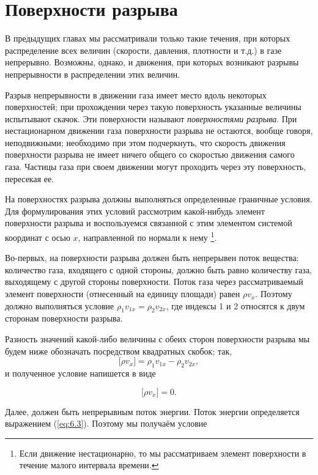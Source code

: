 \section{Поверхности разрыва}\label{sec:p84}

В предыдущих главах мы рассматривали только такие течения, при которых распределение всех величин (скорости, давления, плотности и т.д.) в газе непрерывно.
Возможны, однако, и движения, при которых возникают разрывы непрерывности в распределении этих величин.

Разрыв непрерывности в движении газа имеет место вдоль некоторых поверхностей; при прохождении через такую поверхность указанные величины испытывают скачок.
Эти поверхности называют \emph{поверхностями разрыва}.
При нестационарном движении газа поверхности разрыва не остаются, вообще говоря, неподвижными; необходимо при этом подчеркнуть, что скорость движения поверхности разрыва не имеет ничего общего со скоростью движения самого газа. Частицы газа при своем движении могут проходить через эту поверхность, пересекая ее.

На поверхностях разрыва должны выполняться определенные граничные условия. Для формулирования этих условий рассмотрим какой-нибудь элемент поверхности разрыва и воспользуемся связанной с этим элементом системой координат с осью $x$, направленной по нормали к нему \footnote{Если движение нестационарно, то мы рассматриваем элемент поверхности в течение малого интервала времени.}.

Во-первых, на поверхности разрыва должен быть непрерывен поток вещества: количество газа, входящего с одной стороны, должно быть равно количеству газа, выходящему с другой стороны поверхности.
Поток газа через рассматриваемый элемент поверхности (отнесенный на единицу площади) равен $\rho v_x$.
Поэтому должно выполняться условие $\rho_1 v_{1x} = \rho_2 v_{2x}$, где индексы 1 и 2 относятся к двум сторонам поверхности разрыва.

Разность значений какой-либо величины с обеих сторон поверхности разрыва мы будем ниже обозначать посредством квадратных скобок; так,
\[
    \lbrack \rho v_x \rbrack = \rho_1 v_{1x} - \rho_2 v_{2x},
\]
и полученное условие напишется в виде

\begin{equation}
    \label{eq:84.1}
    \lbrack \rho v_x \rbrack = 0.
\end{equation}

Далее, должен быть непрерывным поток энергии. Поток энергии определяется выражением (\ref{eq:6.3}).
Поэтому мы получаём условие

